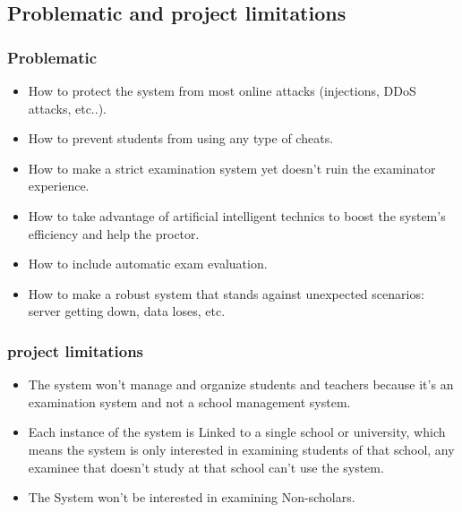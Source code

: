 \documentclass[]{uc2pfecaneva}
\begin{document}
\subsection{Problematic and project limitations}
	\subsubsection{Problematic}

	\begin{itemize}
		\item How to protect the system from most online attacks (injections, DDoS attacks, etc..).
		\item How to prevent students from using any type of cheats.
		\item How to make a strict examination system yet doesn't ruin the examinator experience.
		\item How to take advantage of artificial intelligent technics to boost the system’s efficiency and help the proctor.
		\item How to include automatic exam evaluation.
		\item How to make a robust system that stands against unexpected scenarios: server getting down, data loses, etc.
\end{itemize}


	\subsubsection{project limitations}

	\begin{itemize}
		\item The system won't manage and organize students and teachers because it's an examination system and not a school management system.
		\item Each instance of the system is Linked to a single school or university, which means the system is only interested in examining students of that school, any examinee that doesn't study at that school can’t use the system.
		\item The System won't be interested in examining Non-scholars.
	\end{itemize}
\end{document}
